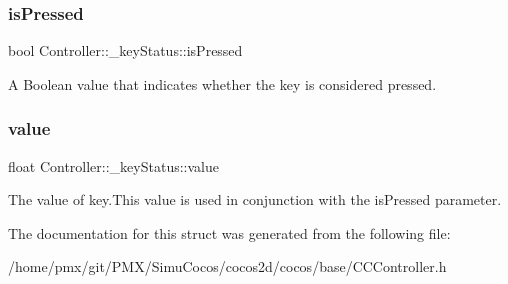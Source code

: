 \subsubsection{\texorpdfstring{is\+Pressed}{isPressed}}
{\footnotesize\ttfamily bool Controller\+::\+\_\+key\+Status\+::is\+Pressed}

A Boolean value that indicates whether the key is considered pressed. \mbox{\label{structController_1_1__keyStatus_aeb73cddb2cdf68bbee943c8678b2ddb7}} 
\subsubsection{\texorpdfstring{value}{value}}
{\footnotesize\ttfamily float Controller\+::\+\_\+key\+Status\+::value}

The value of key.\+This value is used in conjunction with the is\+Pressed parameter. 

The documentation for this struct was generated from the following file\+:\begin{DoxyCompactItemize}
\item 
/home/pmx/git/\+P\+M\+X/\+Simu\+Cocos/cocos2d/cocos/base/C\+C\+Controller.\+h\end{DoxyCompactItemize}
